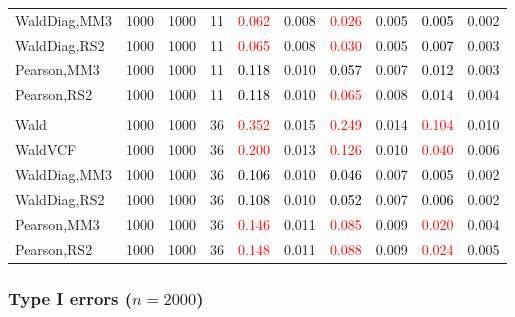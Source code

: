 \documentclass[
]{article}
\begin{document}
\begin{table}[H]
{\begin{tabular}[t]{lrrrrrrlrr}
\hspace{1em}WaldDiag,MM3 & 1000 & 1000 & 11 & \textcolor{red}{0.062} & 0.008 & \textcolor{red}{0.026} & 0.005 & \textcolor{black}{0.005} & 0.002\\
\hspace{1em}WaldDiag,RS2 & 1000 & 1000 & 11 & \textcolor{red}{0.065} & 0.008 & \textcolor{red}{0.030} & 0.005 & \textcolor{black}{0.007} & 0.003\\
\hspace{1em}Pearson,MM3 & 1000 & 1000 & 11 & \textcolor{black}{0.118} & 0.010 & \textcolor{black}{0.057} & 0.007 & \textcolor{black}{0.012} & 0.003\\
\hspace{1em}Pearson,RS2 & 1000 & 1000 & 11 & \textcolor{black}{0.118} & 0.010 & \textcolor{red}{0.065} & 0.008 & \textcolor{black}{0.014} & 0.004\\
\addlinespace[0.3em]
\multicolumn{10}{l}{\textbf{3F 15V}}\\
\hspace{1em}Wald & 1000 & 1000 & 36 & \textcolor{red}{0.352} & 0.015 & \textcolor{red}{0.249} & 0.014 & \textcolor{red}{0.104} & 0.010\\
\hspace{1em}WaldVCF & 1000 & 1000 & 36 & \textcolor{red}{0.200} & 0.013 & \textcolor{red}{0.126} & 0.010 & \textcolor{red}{0.040} & 0.006\\
\hspace{1em}WaldDiag,MM3 & 1000 & 1000 & 36 & \textcolor{black}{0.106} & 0.010 & \textcolor{black}{0.046} & 0.007 & \textcolor{black}{0.005} & 0.002\\
\hspace{1em}WaldDiag,RS2 & 1000 & 1000 & 36 & \textcolor{black}{0.108} & 0.010 & \textcolor{black}{0.052} & 0.007 & \textcolor{black}{0.006} & 0.002\\
\hspace{1em}Pearson,MM3 & 1000 & 1000 & 36 & \textcolor{red}{0.146} & 0.011 & \textcolor{red}{0.085} & 0.009 & \textcolor{red}{0.020} & 0.004\\
\hspace{1em}Pearson,RS2 & 1000 & 1000 & 36 & \textcolor{red}{0.148} & 0.011 & \textcolor{red}{0.088} & 0.009 & \textcolor{red}{0.024} & 0.005\\
\bottomrule
\end{tabular}}
\endgroup{}
\end{table}

\hypertarget{type-i-errors-n2000-3}{%
\subsubsection{\texorpdfstring{Type I errors
(\(n=2000\))}{Type I errors (n=2000)}}\label{type-i-errors-n2000-3}}
\end{document}
